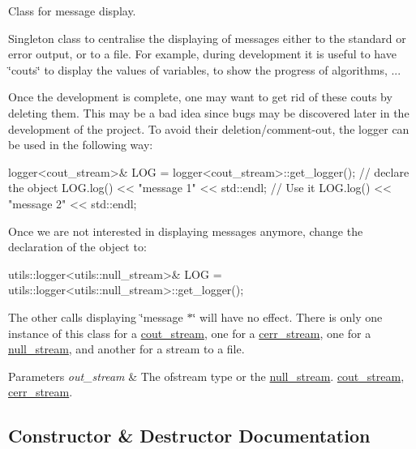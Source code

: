 Class for message display. 

Singleton class to centralise the displaying of messages either to the standard or error output, or to a file. For example, during development it is useful to have \char`\"{}couts\char`\"{} to display the values of variables, to show the progress of algorithms, ...

Once the development is complete, one may want to get rid of these couts by deleting them. This may be a bad idea since bugs may be discovered later in the development of the project. To avoid their deletion/comment-\/out, the logger can be used in the following way\+: \begin{DoxyVerb}logger<cout_stream>& LOG = logger<cout_stream>::get_logger();   // declare the object\n
LOG.log() << "message 1" << std::endl;  // Use it   \n
LOG.log() << "message 2" << std::endl;              \n\n
\end{DoxyVerb}


Once we are not interested in displaying messages anymore, change the declaration of the object to\+: \begin{DoxyVerb}utils::logger<utils::null_stream>& LOG =
    utils::logger<utils::null_stream>::get_logger();
\end{DoxyVerb}


The other calls displaying \char`\"{}message $\ast$\char`\"{} will have no effect. There is only one instance of this class for a \hyperlink{classlgraph_1_1utils_1_1cout__stream}{cout\+\_\+stream}, one for a \hyperlink{classlgraph_1_1utils_1_1cerr__stream}{cerr\+\_\+stream}, one for a \hyperlink{classlgraph_1_1utils_1_1null__stream}{null\+\_\+stream}, and another for a stream to a file.


\begin{DoxyParams}{Parameters}
{\em out\+\_\+stream} & The ofstream type or the \hyperlink{classlgraph_1_1utils_1_1null__stream}{null\+\_\+stream}. \hyperlink{classlgraph_1_1utils_1_1cout__stream}{cout\+\_\+stream}, \hyperlink{classlgraph_1_1utils_1_1cerr__stream}{cerr\+\_\+stream}. \\
\hline
\end{DoxyParams}


\subsection{Constructor \& Destructor Documentation}
\mbox{\label{classlgraph_1_1utils_1_1logger_ace2028a4b282e3cb6593f6f62fee2f2b}} 
